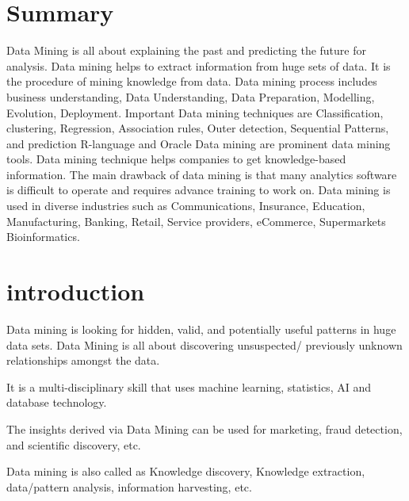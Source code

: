 \documentclass{article}
\begin{document}
\newpage
\section*{Summary}
Data Mining is all about explaining the past and predicting the future for analysis.
Data mining helps to extract information from huge sets of data. It is the procedure of mining knowledge from data.
Data mining process includes business understanding, Data Understanding, Data Preparation, Modelling, Evolution, Deployment.
Important Data mining techniques are Classification, clustering, Regression, Association rules, Outer detection, Sequential Patterns, and prediction
R-language and Oracle Data mining are prominent data mining tools.
Data mining technique helps companies to get knowledge-based information.
The main drawback of data mining is that many analytics software is difficult to operate and requires advance training to work on.
Data mining is used in diverse industries such as Communications, Insurance, Education, Manufacturing, Banking, Retail, Service providers, eCommerce, Supermarkets Bioinformatics.
\cleardoublepage
\tableofcontents
\thispagestyle{empty}
\cleardoublepage
{}
\setcounter{page}{1}
\section{introduction}
\label{sec:intro}
Data mining is looking for hidden, valid, and potentially useful patterns in huge data sets. Data Mining is all about discovering unsuspected/ previously unknown relationships amongst the data.

It is a multi-disciplinary skill that uses machine learning, statistics, AI and database technology.

The insights derived via Data Mining can be used for marketing, fraud detection, and scientific discovery, etc.

Data mining is also called as Knowledge discovery, Knowledge extraction, data/pattern analysis, information harvesting, etc.
\end{document}
